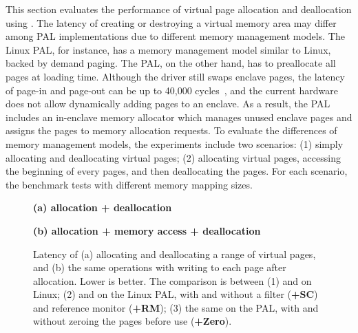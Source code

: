 \label{sec:eval:pal:memory}


This section evaluates the performance of virtual page allocation and deallocation
using \thehostabi{}.
The latency of creating or destroying a virtual memory area
may differ among PAL implementations
due to different memory management models.
The Linux PAL, for instance, has a memory management model
similar to Linux,
backed by demand paging.
The \sgx{} PAL, on the other hand, has to preallocate all pages at loading time.
Although the \sgx{} driver still swaps enclave pages,
the latency of page-in and page-out can be up to 40,000 cycles~\cite{orenbach17eleos},
and the current \sgx{} hardware does not allow dynamically adding pages
to an enclave.
As a result, the \sgx{} PAL includes an in-enclave memory allocator
which manages unused enclave pages
and assigns the pages to memory allocation requests.
To evaluate
the differences of memory management models,
the experiments
include two scenarios:
(1) simply allocating and deallocating virtual pages;
(2) allocating virtual pages,
accessing the beginning of every pages,
and then deallocating the pages.
For each scenario,
the benchmark tests with different memory mapping sizes.





\begin{figure*}[t!]
\centering
\footnotesize
{}
\parbox{0.49\textwidth}{\centering\bf (a) allocation + deallocation}
\parbox{0.49\textwidth}{\centering\bf (b) allocation + memory access + deallocation}
\caption{Latency of (a) allocating and deallocating a range of virtual pages, and (b) the same operations with writing to each page after allocation. Lower is better.
The comparison is between (1)  and  on Linux; (2)  and  on the Linux PAL, with and without a \seccomp{} filter ({\bf +SC}) and reference monitor ({\bf +RM}); (3) the same \hostapis{} on the \sgx{} PAL, with and without zeroing the pages before use ({\bf +Zero}).}
\label{fig:eval:pal:mmap-latency}
\end{figure*}



